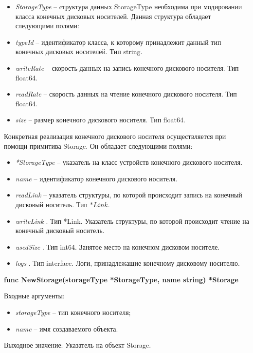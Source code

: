 \begin{itemize}
	
	\item \textit{StorageType} -- cтруктура данных StorageType необходима при модировании класса конечных дисковых носителей. Данная структура обладает следующими полями:

	\item \textit{	typeId} -- идентификатор класса, к которому принадлежит данный тип конечных дисковых носителей. Тип    string. 
	\item \textit{	writeRate} -- скорость данных на запись конечного дискового носителя. Тип float64. 
	\item \textit{	readRate } -- скорость данных на чтение конечного дискового носителя. Тип float64. 
	\item \textit{	size     } -- размер конечного дискового носителя. Тип float64. 
\end{itemize}

Конкретная реализация конечного дискового носителя осуществляется при помощи примитива Storage. Он обладает следующими полями: 

\begin{itemize}
	\item \textit{	*StorageType} -- указатель на класс устройств конечного дискового носителя.  

	\item \textit{	name     } -- идентификатор конечного дискового носителя.

	\item \textit{	readLink } -- указатель структуры, по которой происходит запись на  конечный дисковый носитель. Тип $*Link$. 

	\item \textit{	writeLink }. Тип *Link. Указатель структуры, по которой происходит чтение на  конечный дисковый носитель.

	\item \textit{	usedSize }. Тип int64. Занятое место на конечном дисковом носителе.

	\item \textit{	logs }. Тип interface{}. Логи, принадлежащие конечному дисковому носителю.
\end{itemize}

\textbf{func NewStorage(storageType *StorageType, name string) *Storage}

Входные аргументы:
\begin{itemize}
	\item \textit{storageType} -- тип конечного носителя; 
	\item \textit{name} --  имя создаваемого объекта.
\end{itemize}
Выходное значение: Указатель на объект Storage. 

